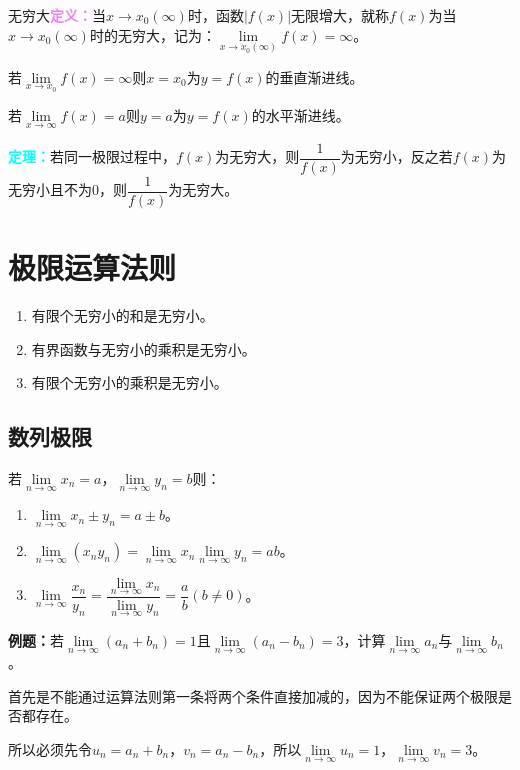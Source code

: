 \documentclass[UTF8, 12pt]{ctexart}
\begin{document}
无穷大\textcolor{violet}{\textbf{定义：}}当$x\to x_0(\infty)$时，函数$\vert f(x)\vert$无限增大，就称$f(x)$为当$x\to x_0(\infty)$时的无穷大，记为：$\lim\limits_{x\to x_0(\infty)}f(x)=\infty$。

若$\lim\limits_{x\to x_0}f(x)=\infty$则$x=x_0$为$y=f(x)$的垂直渐进线。

若$\lim\limits_{x\to\infty}f(x)=a$则$y=a$为$y=f(x)$的水平渐进线。

\textcolor{aqua}{\textbf{定理：}}若同一极限过程中，$f(x)$为无穷大，则$\dfrac{1}{f(x)}$为无穷小，反之若$f(x)$为无穷小且不为0，则$\dfrac{1}{f(x)}$为无穷大。

\section{极限运算法则}

\begin{enumerate}
    \item 有限个无穷小的和是无穷小。
    \item 有界函数与无穷小的乘积是无穷小。
    \item 有限个无穷小的乘积是无穷小。
\end{enumerate}

\subsection{数列极限}

若$\lim\limits_{n\to\infty}x_n=a$，$\lim\limits_{n\to\infty}y_n=b$则：

\begin{enumerate}
    \item $\lim\limits_{n\to\infty}x_n\pm y_n=a\pm b$。
    \item $\lim\limits_{n\to\infty}(x_ny_n)=\lim\limits_{n\to\infty}x_n\lim\limits_{n\to\infty}y_n=ab$。
    \item $\lim\limits_{n\to\infty}\dfrac{x_n}{y_n}=\dfrac{\lim\limits_{n\to\infty}x_n}{\lim\limits_{n\to\infty}y_n}=\dfrac{a}{b}(b\neq 0)$。
\end{enumerate}

\textbf{例题：}若$\lim\limits_{n\to\infty}(a_n+b_n)=1$且$\lim\limits_{n\to\infty}(a_n-b_n)=3$，计算$\lim\limits_{n\to\infty}a_n$与$\lim\limits_{n\to\infty}b_n$。

首先是不能通过运算法则第一条将两个条件直接加减的，因为不能保证两个极限是否都存在。

所以必须先令$u_n=a_n+b_n$，$v_n=a_n-b_n$，所以$\lim\limits_{n\to\infty}u_n=1$，$\lim\limits_{n\to\infty}v_n=3$。
\end{document}
